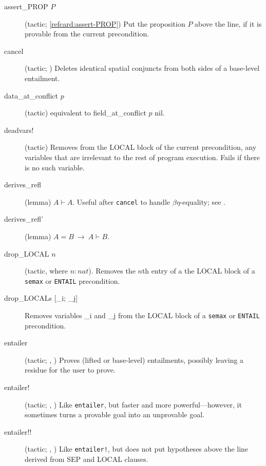 \documentclass[12pt,fleqn,openany,oneside,showtrims]{memoir}
\begin{document}
\begin{description}
\item[\textsf{assert\_PROP} $P$]
(tactic; \autoref{refcard:assert-PROP})
Put the proposition $P$ above the line, if it is provable
  from the current precondition.

\item[\textsf{cancel}]
(tactic; )
Deletes identical spatial conjuncts
from both sides of a base-level entailment.

\item[\textsf{data\_at\_conflict $p$}]
  (tactic) equivalent to \textsf{field\_at\_conflict $p$ nil}.

\item[\textsf{deadvars!}]
  (tactic) Removes from the LOCAL block of the current precondition, any variables that are irrelevant to the rest of program execution.  Fails if there is no such variable.

\item[\textsf{derives\_refl}]
(lemma)  $A\vdash A$.  Useful after \lstinline{cancel}
  to handle $\beta\eta$-equality; see .

\item[\textsf{derives\_refl'}]
(lemma)  $A=B ~\rightarrow~A\vdash B$.

\item[\textsf{drop\_LOCAL $n$}]
(tactic, where $n:nat$). Removes the $n$th entry of a the LOCAL block of a
\lstinline{semax} or \lstinline{ENTAIL} precondition.

\item[\textsf{drop\_LOCALs [\_i; \_j]}]
Removes variables \textsf{\_i} and \textsf{\_j}
from the LOCAL block of a
\lstinline{semax} or \lstinline{ENTAIL} precondition.

\item[\textsf{entailer}]
(tactic; , )
Proves (lifted or base-level) entailments, possibly leaving a residue
for the user to prove.
\item[\textsf{entailer!}]
(tactic; , )
Like \lstinline{entailer}, but faster and more powerful---however,
it sometimes turns a provable goal into an unprovable goal.
\item[\textsf{entailer!!}]
(tactic; , )
  Like \lstinline{entailer!}, but does not put hypotheses above the line
  derived from SEP and LOCAL clauses.


\end{description}
\end{document}

